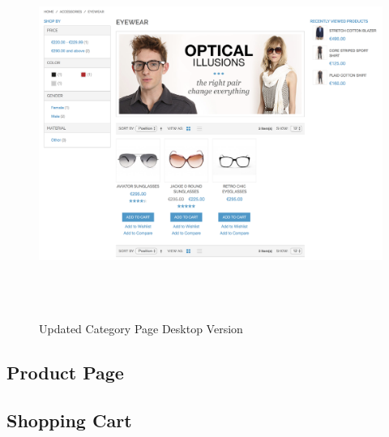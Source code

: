 \begin{figure}[H]
  \centering
    \includegraphics[height=12cm]{images/diagrams/after/desktop-category.png}
  \caption{Updated Category Page Desktop Version}
  \label{fig:desktop-after-category}
\end{figure}
\vspace{0.5cm}

\subsection{Product Page}

\subsection{Shopping Cart}

